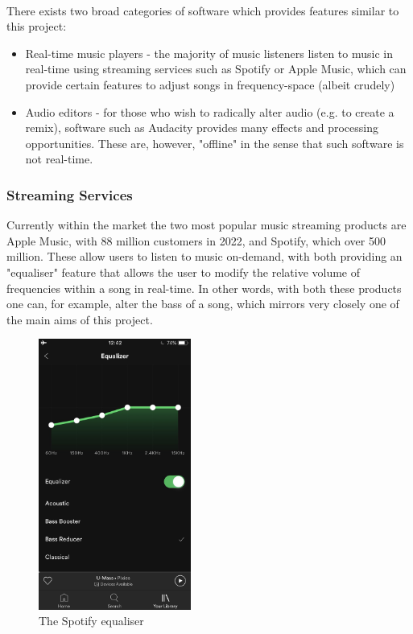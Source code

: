 \paragraph{}
There exists two broad categories of software which provides features similar to this project:
\begin{itemize}
	\item Real-time music players - the majority of music listeners listen to music in real-time using streaming services such as Spotify or Apple Music, which can provide certain features to adjust songs in frequency-space (albeit crudely)

	\item Audio editors - for those who wish to radically alter audio (e.g. to create a remix), software such as Audacity provides many effects and processing opportunities. These are, however, "offline" in the sense that such software is not real-time.
\end{itemize}

\subsubsection{Streaming Services}
Currently within the market the two most popular music streaming products are Apple Music, with 88 million customers in 2022, and Spotify, which over 500 million. These allow users to listen to music on-demand, with both providing an "equaliser" feature that allows the user to modify the relative volume of frequencies within a song in real-time. In other words, with both these products one can, for example, alter the bass of a song, which mirrors very closely one of the main aims of this project.

\begin{figure}[H]
	\caption{The Spotify equaliser}
	\begin{center}
		\includegraphics[width=5cm]{./spotify equaliser.jpg}
	\end{center}
\end{figure}

